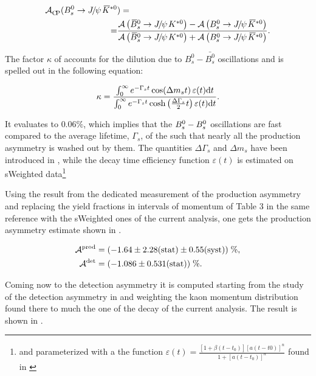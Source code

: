 \begin{align}
\centering
  \Acp\;(\BsJpsiKst&) = \nonumber \\
  = &\frac{\totAmp{\BsbarJpsiKst} - \totAmp{\BsJpsiKst}}{\totAmp{\BsbarJpsiKst} + \totAmp{\BsJpsiKst}}.
\label{acp_corrected_amps}
\end{align}

\noindent The factor $\kappa$ of  accounts for the dilution due to $B^0_s-\bar{B^0_s}$
oscillations\cite{LHCb-PAPER-2013-018} and is spelled out in the following equation:

\begin{equation}
  \centering
 \kappa = \frac{\int_0^\infty  e^{-\Gamma_s t} \cos \!\left( \Delta m_s t \right ) \varepsilon(t)\mathrm{d}t}{\int_0^\infty  e^{-\Gamma_s t} \cosh \left( \frac{\Delta \Gamma_s}{2} t \right ) \varepsilon(t)\mathrm{d}t}.
\label{kappa}
\end{equation}

\noindent It evaluates to $0.06\%$, which implies that the $B^0_s-B^0_s$ oscillations are fast compared to the
average lifetime, $\Gamma_s$, of the \BBbarSyst such that nearly all the production asymmetry is washed out by them.
The quantities $\Delta\Gamma_s$ and $\Delta m_s$ have been introduced in ,
while the decay time efficiency function $\varepsilon(t)$ is estimated on sWeighted \BsJpsiKst
data\footnote{and parameterized with a the function $\varepsilon(t)= \frac{[1+\beta(t-t_0)][a(t-t0)]^n}{1+[a(t-t_0)]^n}$ found in \cite{LHCb-PAPER-2014-053}}

Using the result from the dedicated \lhcb measurement of the production asymmetry \cite{LHCb-PAPER-2014-042}
and replacing the yield fractions in intervals of \Bs momentum of Table 3 in the same reference with the sWeighted \BsJpsiKst ones of the current analysis,
one gets the production asymmetry estimate shown in .

\begin{subequations}
  \label{exp_assym}
  \begin{align}
    \centering
    \Aprod &= (-1.64 \pm 2.28 \stat \pm 0.55 \syst) \;\%, \label{prod_assym} \\
    \Adet  &= (-1.086 \pm 0.531 \stat) \;\%. \label{det_assym}
  \end{align}
\end{subequations}

\noindent Coming now to the detection asymmetry it is computed starting from the \lhcb study of the detection asymmetry
in\cite{LHCb-PAPER-2014-013} and weighting the kaon momentum distribution found there to much the one of the \BsJpsiKst
decay of the current analysis. The result is shown in .

